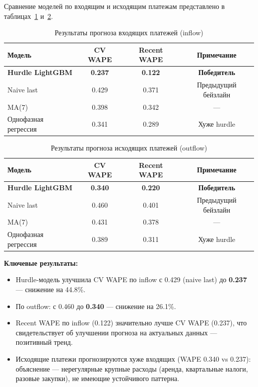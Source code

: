 Сравнение моделей по входящим и исходящим платежам представлено в таблицах~\ref{tab:inflow_model} и~\ref{tab:outflow_model}.

\begin{table}[H]
\centering
\caption{Результаты прогноза входящих платежей (inflow)}
\label{tab:inflow_model}
\begin{tabular}{lccc}
\toprule
\textbf{Модель} & \textbf{CV WAPE} & \textbf{Recent WAPE} & \textbf{Примечание} \\
\midrule
\textbf{Hurdle LightGBM} & \textbf{0.237} & \textbf{0.122} & \textbf{Победитель} \\
Naive last & 0.429 & 0.371 & Предыдущий бейзлайн \\
MA(7) & 0.398 & 0.342 & --- \\
Однофазная регрессия & 0.341 & 0.289 & Хуже hurdle \\
\bottomrule
\end{tabular}
\end{table}

\begin{table}[H]
\centering
\caption{Результаты прогноза исходящих платежей (outflow)}
\label{tab:outflow_model}
\begin{tabular}{lccc}
\toprule
\textbf{Модель} & \textbf{CV WAPE} & \textbf{Recent WAPE} & \textbf{Примечание} \\
\midrule
\textbf{Hurdle LightGBM} & \textbf{0.340} & \textbf{0.220} & \textbf{Победитель} \\
Naive last & 0.460 & 0.401 & Предыдущий бейзлайн \\
MA(7) & 0.431 & 0.378 & --- \\
Однофазная регрессия & 0.389 & 0.311 & Хуже hurdle \\
\bottomrule
\end{tabular}
\end{table}

\textbf{Ключевые результаты:}
\begin{itemize}
  \item Hurdle-модель улучшила CV WAPE по inflow с 0.429 (naive last) до \textbf{0.237} --- снижение на 44.8\%.
  \item По outflow: с 0.460 до \textbf{0.340} --- снижение на 26.1\%.
  \item Recent WAPE по inflow (0.122) значительно лучше CV WAPE (0.237), что свидетельствует об улучшении прогноза на актуальных данных --- позитивный тренд.
  \item Исходящие платежи прогнозируются хуже входящих (WAPE 0.340 vs 0.237): объяснение --- нерегулярные крупные расходы (аренда, квартальные налоги, разовые закупки), не имеющие устойчивого паттерна.
\end{itemize}


